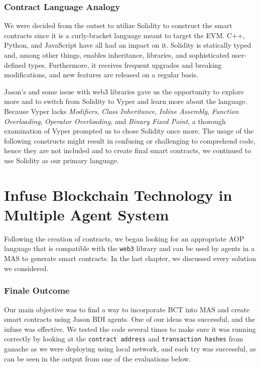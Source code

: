 \subsubsection{Contract Language Analogy}

We were decided from the outset to utilize Solidity to construct the smart contracts since it is a curly-bracket language meant to target the \ac{EVM}. C++, Python, and JavaScript have all had an impact on it. Solidity is statically typed and, among other things, enables inheritance, libraries, and sophisticated user-defined types. Furthermore, it receives frequent upgrades and breaking modifications, and new features are released on a regular basis. 

\vspace{.5cm}

Jason's and some issue with web3 libraries gave us the opportunity to explore more and to switch from Solidity to Vyper and learn more about the language. Because Vyper lacks \textit{Modifiers}, \textit{Class Inheritance}, \textit{Inline Assembly}, \textit{Function Overloading}, \textit{Operator Overloading}, and \textit{Binary Fixed Point}, a thorough examination of Vyper prompted us to chose Solidity once more. The usage of the following constructs might result in confusing or challenging to comprehend code, hence they are not included and to create final smart contracts, we continued to use Solidity as our primary language.


\section{Infuse Blockchain Technology in Multiple Agent System}

Following the creation of contracts, we began looking for an appropriate \ac{AOP} language that is compatible with the \texttt{web3} library and can be used by agents in a \ac{MAS} to generate smart contracts. In the last chapter, we discussed every solution we considered. 

\subsubsection{Finale Outcome}

Our main objective was to find a way to incorporate \ac{BCT} into \ac{MAS} and create smart contracts using Jason \ac{BDI} agents. One of our ideas was successful, and the infuse was effective. We tested the code several times to make sure it was running correctly by looking at the \texttt{contract address} and \texttt{transaction hashes} from ganache as we were deploying using local network, and each try was successful, as can be seen in the output from one of the evaluations below.


